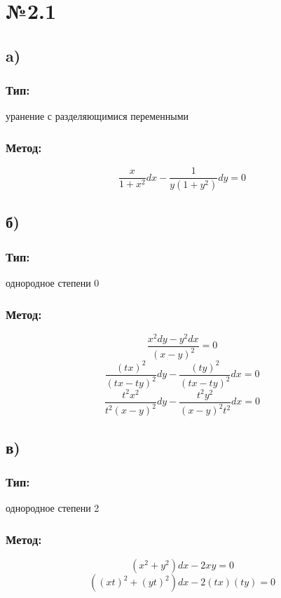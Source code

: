 \documentclass{article}
\begin{document}
\section*{№2.1}
\subsection*{a)}
\subsubsection*{Тип:} 
уранение с разделяющимися переменными

\subsubsection*{Метод:}
\begin{equation*}
\frac{x}{1 + x^2}dx - \frac{1}{y(1+y^2)}dy = 0
\end{equation*}

\subsection*{б)}
\subsubsection*{Тип:} 
однородное степени 0

\subsubsection*{Метод:}
\begin{equation*}
\frac{x^2dy - y^2dx}{(x - y)^2} = 0
\end{equation*}
\begin{equation*}
\frac{(tx)^2}{(tx - ty)^2}dy - \frac{(ty)^2}{(tx - ty)^2}dx = 0
\end{equation*}
\begin{equation*}
\frac{t^2x^2}{t^2(x - y)^2}dy - \frac{t^2y^2}{(x - y)^2t^2}dx = 0
\end{equation*}

\subsection*{в)}
\subsubsection*{Тип:} 
однородное степени 2

\subsubsection*{Метод:}
\begin{equation*}
(x^2+ y^2)dx - 2xy = 0
\end{equation*}
\begin{equation*}
((xt)^2+ (yt)^2)dx - 2(tx)(ty) = 0
\end{equation*}
\end{document}
